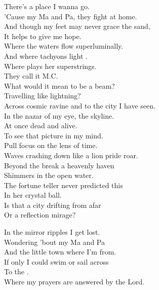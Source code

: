 
\label{album:flight-b741}




There's a place I wanna go. \\
'Cause my Ma and Pa, they fight at home. \\
And though my feet may never grace the sand, \\
It helps to give me hope. \\
Where the waters flow superluminally. \\
And where tachyons light . \\
Where  plays her superstrings. \\
They call it M.C. \\

What would it mean to be a beam? \\
Travelling like lightning? \\
Across cosmic ravine and to the city I have seen. \\
In the nazar of my eye, the skyline. \\
At once dead and alive. \\
To see that picture in my mind. \\
Pull focus on the lens of time. \\

Waves crashing down like a lion pride roar. \\
Beyond the break a heavenly haven \\
Shimmers in the open water. \\
The fortune teller never predicted this \\
In her crystal ball. \\
Is that a city drifting from afar \\
Or a reflection mirage? \\


In the mirror ripples I get lost. \\
Wondering 'bout my Ma and Pa \\
And the little town where I'm from. \\
If only I could swim or sail across \\
To the . \\
Where my prayers are answered by the Lord. \\

